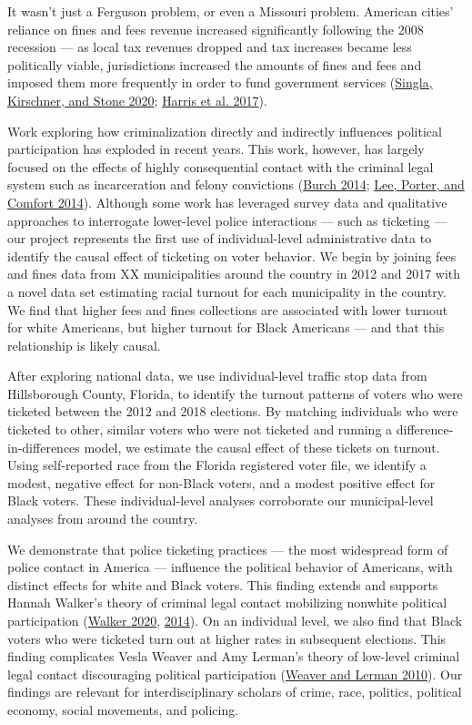 \documentclass[
  12pt,
]{article}
\begin{document}
It wasn't just a Ferguson problem, or even a Missouri problem. American cities' reliance on fines and fees revenue increased significantly following the 2008 recession --- as local tax revenues dropped and tax increases became less politically viable, jurisdictions increased the amounts of fines and fees and imposed them more frequently in order to fund government services (\protect\hyperlink{ref-Singla2020}{Singla, Kirschner, and Stone 2020}; \protect\hyperlink{ref-Harris2017}{Harris et al. 2017}).

Work exploring how criminalization directly and indirectly influences political participation has exploded in recent years. This work, however, has largely focused on the effects of highly consequential contact with the criminal legal system such as incarceration and felony convictions (\protect\hyperlink{ref-Burch2014}{Burch 2014}; \protect\hyperlink{ref-Lee2014}{Lee, Porter, and Comfort 2014}). Although some work has leveraged survey data and qualitative approaches to interrogate lower-level police interactions --- such as ticketing --- our project represents the first use of individual-level administrative data to identify the causal effect of ticketing on voter behavior. We begin by joining fees and fines data from XX municipalities around the country in 2012 and 2017 with a novel data set estimating racial turnout for each municipality in the country. We find that higher fees and fines collections are associated with lower turnout for white Americans, but higher turnout for Black Americans --- and that this relationship is likely causal.

After exploring national data, we use individual-level traffic stop data from Hillsborough County, Florida, to identify the turnout patterns of voters who were ticketed between the 2012 and 2018 elections. By matching individuals who were ticketed to other, similar voters who were not ticketed and running a difference-in-differences model, we estimate the causal effect of these tickets on turnout. Using self-reported race from the Florida registered voter file, we identify a modest, negative effect for non-Black voters, and a modest positive effect for Black voters. These individual-level analyses corroborate our municipal-level analyses from around the country.

We demonstrate that police ticketing practices --- the most widespread form of police contact in America --- influence the political behavior of Americans, with distinct effects for white and Black voters. This finding extends and supports Hannah Walker's theory of criminal legal contact mobilizing nonwhite political participation (\protect\hyperlink{ref-Walker2020}{Walker 2020}, \protect\hyperlink{ref-Walker2014}{2014}). On an individual level, we also find that Black voters who were ticketed turn out at higher rates in subsequent elections. This finding complicates Vesla Weaver and Amy Lerman's theory of low-level criminal legal contact discouraging political participation (\protect\hyperlink{ref-Weaver2010}{Weaver and Lerman 2010}). Our findings are relevant for interdisciplinary scholars of crime, race, politics, political economy, social movements, and policing.
\end{document}
